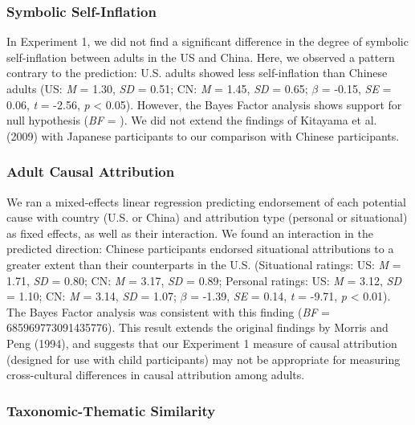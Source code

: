 \documentclass[
  man]{apa6}
\begin{document}
\hypertarget{symbolic-self-inflation-3}{%
\subsubsection{Symbolic Self-Inflation}\label{symbolic-self-inflation-3}}

In Experiment 1, we did not find a significant difference in the degree of symbolic self-inflation between adults in the US and China. Here, we observed a pattern contrary to the prediction: U.S. adults showed less self-inflation than Chinese adults (US: \emph{M} = 1.30, \emph{SD} = 0.51; CN: \emph{M} = 1.45, \emph{SD} = 0.65; \(\beta\) = -0.15, \emph{SE} = 0.06, \emph{t} = -2.56, \emph{p} \textless{} 0.05). However, the Bayes Factor analysis shows support for null hypothesis (\emph{BF} = ). We did not extend the findings of Kitayama et al. (2009) with Japanese participants to our comparison with Chinese participants.

\hypertarget{adult-causal-attribution-1}{%
\subsubsection{Adult Causal Attribution}\label{adult-causal-attribution-1}}

We ran a mixed-effects linear regression predicting endorsement of each potential cause with country (U.S. or China) and attribution type (personal or situational) as fixed effects, as well as their interaction. We found an interaction in the predicted direction: Chinese participants endorsed situational attributions to a greater extent than their counterparts in the U.S. (Situational ratings: US: \emph{M} = 1.71, \emph{SD} = 0.80; CN: \emph{M} = 3.17, \emph{SD} = 0.89; Personal ratings: US: \emph{M} = 3.12, \emph{SD} = 1.10; CN: \emph{M} = 3.14, \emph{SD} = 1.07; \(\beta\) = -1.39, \emph{SE} = 0.14, \emph{t} = -9.71, \emph{p} \textless{} 0.01). The Bayes Factor analysis was consistent with this finding (\emph{BF} = 685969773091435776). This result extends the original findings by Morris and Peng (1994), and suggests that our Experiment 1 measure of causal attribution (designed for use with child participants) may not be appropriate for measuring cross-cultural differences in causal attribution among adults.

\hypertarget{taxonomic-thematic-similarity}{%
\subsubsection{Taxonomic-Thematic Similarity}\label{taxonomic-thematic-similarity}}
\end{document}
